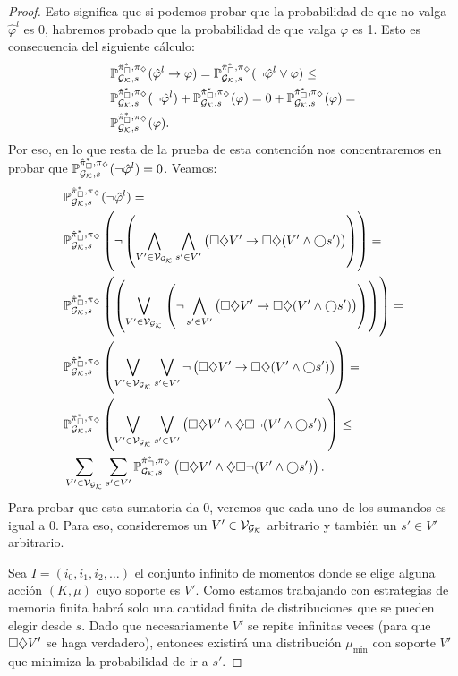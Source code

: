 \begin{proof}
	Esto significa que si podemos probar que la probabilidad de que no valga $\hat
		\varphi^l$ es 0, habremos probado que la probabilidad de que valga $\varphi$ es
	1. Esto es consecuencia del siguiente cálculo:
	\begin{align*}
		&\mathbb{P}_{\mathcal{G}_{\mathcal{K}},s}^{\hat{\pi}_{\square}^{*}, \pi_\diamondsuit}(\hat{\varphi}^l \rightarrow \varphi) = \mathbb{P}_{\mathcal{G}_{\mathcal{K}},s}^{\hat{\pi}_{\square}^{*}, \pi_\diamondsuit}(\neg \hat{\varphi}^l \vee \varphi) \leq \\
		&\mathbb{P}_{\mathcal{G}_{\mathcal{K}},s}^{\hat{\pi}_{\square}^{*}, \pi_\diamondsuit}(\neg \hat{\varphi}^l) + \mathbb{P}_{\mathcal{G}_{\mathcal{K}},s}^{\hat{\pi}_{\square}^{*}, \pi_\diamondsuit}(\varphi) = 0 + \mathbb{P}_{\mathcal{G}_{\mathcal{K}},s}^{\hat{\pi}_{\square}^{*}, \pi_\diamondsuit}(\varphi) = \\
		&\mathbb{P}_{\mathcal{G}_{\mathcal{K}},s}^{\hat{\pi}_{\square}^{*}, \pi_\diamondsuit}(\varphi).
	\end{align*}
	Por eso, en lo que resta de la prueba de esta contención nos concentraremos en
	probar que $\mathbb{P}_{\mathcal{G}_{\mathcal{K}},s}^{\hat{\pi}_{\square}^{*}, \pi_\diamondsuit}(\neg \hat{\varphi}^l) = 0$.
	Veamos:
	\begin{align*}
		&\mathbb{P}_{\mathcal{G}_{\mathcal{K}}, s}^{\hat{\pi}_{\square}^{*}, \pi_\diamondsuit}(\neg \hat{\varphi}^l) = \\
		&\mathbb{P}_{\mathcal{G}_{\mathcal{K}}, s}^{\hat{\pi}_{\square}^{*}, \pi_\diamondsuit}\left(\neg \left( \bigwedge_{V' \in \mathcal{V}_{\mathcal{G}_{\mathcal{K}}}} \bigwedge_{s' \in V'} \left( \square \diamondsuit V' \rightarrow \square \diamondsuit (V' \wedge \bigcirc s' ) \right)\right)\right) = \\
		&\mathbb{P}_{\mathcal{G}_{\mathcal{K}}, s}^{\hat{\pi}_{\square}^{*}, \pi_\diamondsuit}\left(\left( \bigvee_{V' \in \mathcal{V}_{\mathcal{G}_{\mathcal{K}}}} \left( \neg \bigwedge_{s' \in V'} \left( \square \diamondsuit V' \rightarrow \square \diamondsuit (V' \wedge \bigcirc s' ) \right)\right)\right)\right) = \\
		&\mathbb{P}_{\mathcal{G}_{\mathcal{K}}, s}^{\hat{\pi}_{\square}^{*}, \pi_\diamondsuit} \left(\bigvee_{V' \in \mathcal{V}_{\mathcal{G}_{\mathcal{K}}}} \bigvee_{s' \in V'} \neg \left( \square \diamondsuit V' \rightarrow \square \diamondsuit (V' \wedge \bigcirc s' ) \right)\right) = \\
		&\mathbb{P}_{\mathcal{G}_{\mathcal{K}}, s}^{\hat{\pi}_{\square}^{*}, \pi_\diamondsuit} \left(\bigvee_{V' \in \mathcal{V}_{\mathcal{G}_{\mathcal{K}}}} \bigvee_{s' \in V'} \left( \square \diamondsuit V' \wedge \diamondsuit \square \neg (V' \wedge \bigcirc s' ) \right)\right) \leq \\
		&\sum_{V' \in \mathcal{V}_{\mathcal{G}_{\mathcal{K}}}} \sum_{s' \in V'} \mathbb{P}_{\mathcal{G}_{\mathcal{K}}, s}^{\hat{\pi}_{\square}^{*}, \pi_\diamondsuit} \left( \square \diamondsuit V' \wedge \diamondsuit \square \neg (V' \wedge \bigcirc s' ) \right).
	\end{align*}
	Para probar que esta sumatoria da 0, veremos que cada uno de los sumandos es
	igual a $0$. Para eso, consideremos un $V' \in \mathcal{V}_{\mathcal{G}_{\mathcal{K}}}$ arbitrario y también un
	$s' \in V'$ arbitrario.

	Sea $I = (i_0, i_1, i_2, \dots)$ el conjunto infinito de momentos donde se
	elige alguna acción $(K,\mu)$ cuyo soporte es $V'$. Como estamos trabajando con
	estrategias de memoria finita habrá solo una cantidad finita de distribuciones
	que se pueden elegir desde $s$. Dado que necesariamente $V'$ se repite
	infinitas veces (para que $\square \diamondsuit V'$ se haga verdadero), entonces
	existirá una distribución $\mu_\text{min}$ con soporte $V'$ que minimiza la
	probabilidad de ir a $s'$.


\end{proof}
